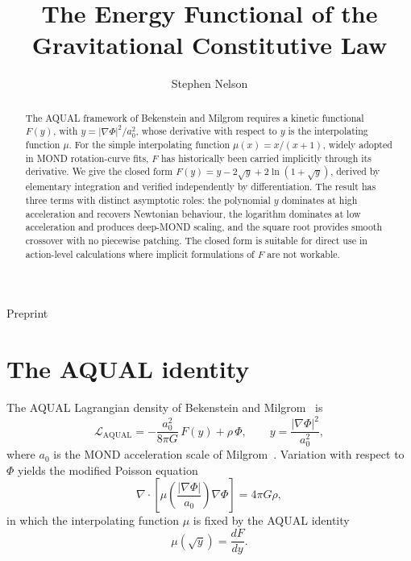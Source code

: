 \documentclass[twocolumn]{iopjournal}
\renewcommand{\articletype}[1]{%
  {\vspace*{-8mm}\noindent \Large \sf Preprint}\par
  \vspace*{6mm}\noindent{\scriptsize \sf{\bfseries \MakeUppercase{#1}}}}
\theoremstyle{definition}
\begin{document}
\articletype{Supplementary Material}

\title{The Energy Functional of the Gravitational Constitutive Law}

\author{Stephen Nelson}



\begin{abstract}
The AQUAL framework of Bekenstein and Milgrom requires a kinetic
functional $F(y)$, with $y = |\nabla\Phi|^2/a_0^2$, whose derivative
with respect to $y$ is the interpolating function $\mu$.  For the
simple interpolating function $\mu(x) = x/(x+1)$, widely adopted in
MOND rotation-curve fits, $F$ has historically been carried
implicitly through its derivative.  We give the closed form
$F(y) = y - 2\sqrt{y} + 2\ln(1 + \sqrt{y})$, derived by elementary
integration and verified independently by differentiation.  The
result has three terms with distinct asymptotic roles: the
polynomial $y$ dominates at high acceleration and recovers
Newtonian behaviour, the logarithm dominates at low acceleration
and produces deep-MOND scaling, and the square root provides smooth
crossover with no piecewise patching.  The closed form is suitable
for direct use in action-level calculations where implicit
formulations of $F$ are not workable.
\end{abstract}


\section*{The AQUAL identity}

The AQUAL Lagrangian density of Bekenstein and
Milgrom~\cite{BekensteinMilgrom1984} is
\begin{equation}
  \mathcal{L}_{\text{AQUAL}}
  = -\frac{a_0^2}{8\pi G}\, F(y) + \rho\,\Phi,
  \qquad
  y = \frac{|\nabla\Phi|^2}{a_0^2},
  \label{eq:lagrangian}
\end{equation}
where $a_0$ is the MOND acceleration scale of
Milgrom~\cite{Milgrom1983}.  Variation with respect to $\Phi$ yields
the modified Poisson equation
\begin{equation}
  \nabla \cdot \left[\mu\!\left(\frac{|\nabla\Phi|}{a_0}\right)
  \nabla\Phi \right] = 4\pi G\rho,
  \label{eq:modified_poisson}
\end{equation}
in which the interpolating function $\mu$ is fixed by the AQUAL
identity
\begin{equation}
  \mu(\sqrt{y}) = \frac{dF}{dy}.
  \label{eq:aqual_identity}
\end{equation}
\end{document}

